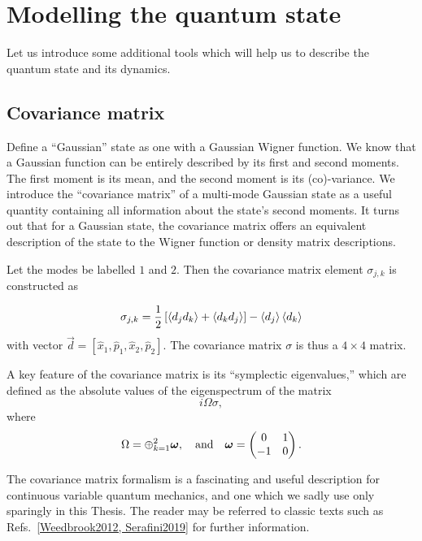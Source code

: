\FloatBarrier
\section{Modelling the quantum state}
Let us introduce some additional tools which will help us to describe the quantum state and its dynamics.


\FloatBarrier
\subsection{Covariance matrix}
Define a ``Gaussian'' state as one with a Gaussian Wigner function. We know that a Gaussian function can be entirely described by its first and second moments. The first moment is its mean, and the second moment is its (co)-variance. We introduce the ``covariance matrix'' of a multi-mode Gaussian state as a useful quantity containing all information about the state's second moments. It turns out that for a Gaussian state, the covariance matrix offers an equivalent description of the state to the Wigner function or density matrix descriptions. 


Let the modes be labelled $1$ and $2$. Then the covariance matrix element $\sigma_{j, k}$ is constructed as

\begin{equation}\label{eqn:intro_covariancematrix}
\sigma_{j, k} = \frac{1}{2} \left[ \ev{d_j d_k} + \ev{d_k d_j}\right] - \ev{d_j} \ev{d_k}
\end{equation}
with vector $\overrightarrow{d} = \left[\hat{x}_1, \hat{p}_1, \hat{x}_2, \hat{p}_2 \right]$. The covariance matrix $\sigma$ is thus a $4 \times 4$ matrix. 

A key feature of the covariance matrix is its ``symplectic eigenvalues,'' which are defined as the absolute values of the eigenspectrum of the matrix
\begin{equation}
i \Omega \sigma,
\end{equation}
where 
\begin{equation}
\Omega = \oplus_{k=1}^2 \bm{\omega}, \qq{and} \bm{\omega} = \pmqty{0 & 1 \\ -1 & 0}.
\end{equation}

\noindent The covariance matrix formalism is a fascinating and useful description for continuous variable quantum mechanics, and one which we sadly use only sparingly in this Thesis. The reader may be referred to classic texts such as Refs.~\ref{Weedbrook2012, Serafini2019} for further information.


